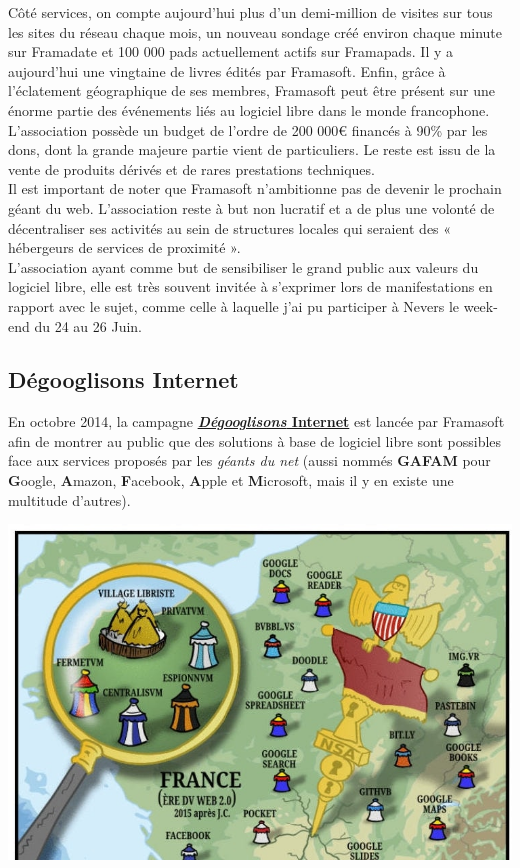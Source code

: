\documentclass[10pt,a4paper, twoside]{report}
\begin{document}
	Côté services, on compte aujourd'hui plus d'un demi-million de visites sur tous les sites du réseau chaque mois, un nouveau sondage créé environ chaque minute sur Framadate et 100 000 pads actuellement actifs sur Framapads. Il y a aujourd'hui une vingtaine de livres édités par Framasoft. Enfin, grâce à l'éclatement géographique de ses membres, Framasoft peut être présent sur une énorme partie des événements liés au logiciel libre dans le monde francophone.
	\\
	
	L'association possède un budget de l'ordre de 200 000\euro{} financés à 90\% par les dons, dont la grande majeure partie vient de particuliers. Le reste est issu de la vente de produits dérivés et de rares prestations techniques.
	\\
	
	Il est important de noter que Framasoft n'ambitionne pas de devenir le prochain géant du web. L'association reste à but non lucratif et a de plus une volonté de décentraliser ses activités au sein de structures locales qui seraient des « hébergeurs de services de proximité ».
	\\
		
	L'association ayant comme but de sensibiliser le grand public aux valeurs du logiciel libre, elle est très souvent invitée à s'exprimer lors de manifestations en rapport avec le sujet, comme celle à laquelle j'ai pu participer à Nevers le week-end du 24 au 26 Juin.
	
	\subsection{Dégooglisons Internet}
	\label{subsec:degoogl}
	
	En octobre 2014, la campagne \href{https://degooglisons-internet.org/}{\textbf{\textit{Dégooglisons} Internet}} est lancée par Framasoft afin de montrer au public que des solutions à base de logiciel libre sont possibles face aux services proposés par les \textit{géants du net} (aussi nommés \textbf{GAFAM} pour \textbf{G}oogle, \textbf{A}mazon, \textbf{F}acebook, \textbf{A}pple et \textbf{M}icrosoft, mais il y en existe une multitude d'autres).
	

	\centerline{\includegraphics[width=1\textwidth]{images/degooglisons-internet.jpg}}
\end{document}
